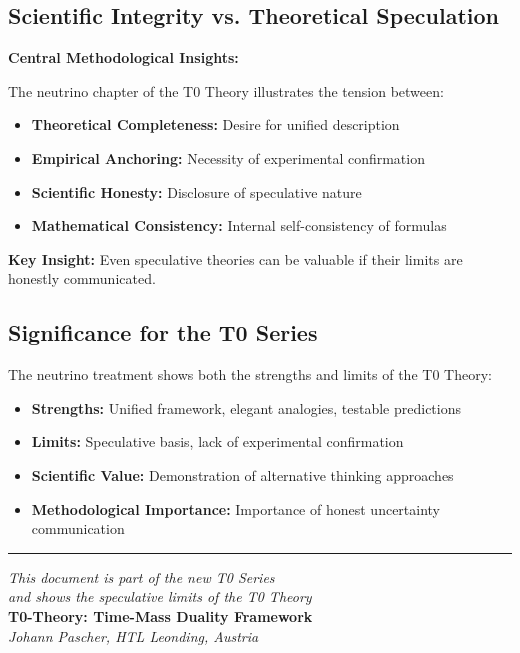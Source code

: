 \documentclass[12pt,a4paper]{article}
\begin{document}
	\subsection{Scientific Integrity vs. Theoretical Speculation}
	
	\begin{keyresult}
		\textbf{Central Methodological Insights:}
		
		The neutrino chapter of the T0 Theory illustrates the tension between:
		
		\begin{itemize}
			\item \textbf{Theoretical Completeness:} Desire for unified description
			\item \textbf{Empirical Anchoring:} Necessity of experimental confirmation
			\item \textbf{Scientific Honesty:} Disclosure of speculative nature
			\item \textbf{Mathematical Consistency:} Internal self-consistency of formulas
		\end{itemize}
		
		\textbf{Key Insight:} Even speculative theories can be valuable if their limits are honestly communicated.
	\end{keyresult}
	
	\subsection{Significance for the T0 Series}
	
	The neutrino treatment shows both the strengths and limits of the T0 Theory:
	
	\begin{itemize}
		\item \textbf{Strengths:} Unified framework, elegant analogies, testable predictions
		\item \textbf{Limits:} Speculative basis, lack of experimental confirmation
		\item \textbf{Scientific Value:} Demonstration of alternative thinking approaches
		\item \textbf{Methodological Importance:} Importance of honest uncertainty communication
	\end{itemize}
	
	\begin{center}
		\hrule
		\vspace{0.5cm}
		\textit{This document is part of the new T0 Series}\\
		\textit{and shows the speculative limits of the T0 Theory}\\
		\vspace{0.3cm}
		\textbf{T0-Theory: Time-Mass Duality Framework}\\
		\textit{Johann Pascher, HTL Leonding, Austria}\\
	\end{center}
	
\end{document}
